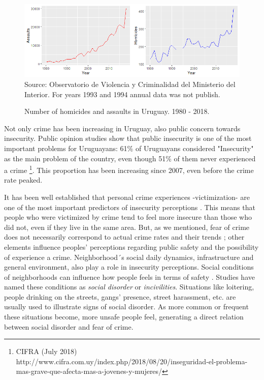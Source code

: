 \documentclass[11pt]{article}
\begin{document}
\begin{figure}[H]
\begin{center}
    \caption{Number of homicides and assaults in Uruguay. 1980 - 2018.}
        \label{fig:homrap19802017}
    \includegraphics{evo_delitos.png}
    \footnotesize{Source: Observatorio de Violencia y Criminalidad del Ministerio del Interior. For years 1993 and 1994 annual data was not publish.}
\end{center}
\end{figure}

Not only crime has been increasing in Uruguay, also public concern towards insecurity. Public opinion studies show that public insecurity is one of the most important problems for Uruguayans: 61\% of Uruguayans considered "Insecurity" as the main problem of the country, even though 51\% of them never experienced a crime \footnote{CIFRA (July 2018) http://www.cifra.com.uy/index.php/2018/08/20/inseguridad-el-problema-mas-grave-que-afecta-mas-a-jovenes-y-mujeres/}. This proportion has been increasing since 2007, even before the crime rate peaked.

It has been well established that personal crime experiences -victimization- are one of the most important predictors of insecurity perceptions \citep{cruz2009public}. This means that people who were victimized by crime tend to feel more insecure than those who did not, even if they live in the same area. But, as we mentioned, fear of crime does not necessarily correspond to actual crime rates and their trends \citep{wong2012bringing}; other elements influence peoples' perceptions regarding public safety and the possibility of experience a crime. Neighborhood´s social daily dynamics, infrastructure and general environment, also play a role in insecurity perceptions. Social conditions of neighborhoods can influence how people feels in terms of safety \citep{cruz2009public, brunton2011neighborhoods, valera2014perceived}. Studies have named these conditions as \textit{social disorder} or \textit{incivilities}. Situations like loitering, people drinking on the streets, gangs' presence, street harassment, etc. \citep{bennett1994determinants, valera2014perceived} are usually used to illustrate signs of social disorder. As more common or frequent these situations become, more unsafe people feel, generating a direct relation between social disorder and fear of crime.
\end{document}
